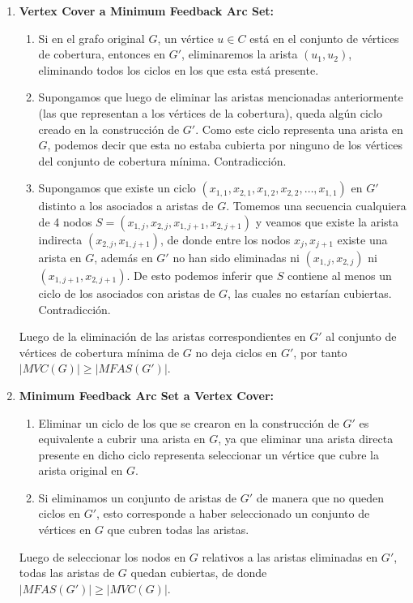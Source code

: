 \documentclass{article}
\begin{document}
\begin{enumerate} 
    \item \textbf{Vertex Cover a Minimum Feedback Arc Set:}
        \begin{enumerate}
            \item Si en el grafo original $ G $, un vértice $ u \in C $ está en el conjunto de vértices de cobertura, entonces en $ G' $, eliminaremos la arista $ (u_1, u_2) $, eliminando todos los ciclos en los que esta está presente.
            \item Supongamos que luego de eliminar las aristas mencionadas anteriormente (las que representan a los vértices de la cobertura), queda algún ciclo creado en la construcción de $ G' $. Como este ciclo representa una arista en $ G $, podemos decir que esta no estaba cubierta por ninguno de los vértices del conjunto de cobertura mínima. Contradicción.
            \item Supongamos que existe un ciclo $(x_{1,1}, x_{2, 1}, x_{1, 2}, x_{2, 2}, \dots, x_{1, 1})$ en $G'$ distinto a los asociados a aristas de $G$. Tomemos una secuencia cualquiera de 4 nodos $S = (x_{1, j}, x_{2, j}, x_{1, j + 1}, x_{2, j + 1})$ y veamos que existe la arista indirecta $(x_{2, j}, x_{1, j + 1})$, de donde entre los nodos $x_j, x_{j + 1}$ existe una arista en $G$, además en $G'$ no han sido eliminadas ni $(x_{1, j}, x_{2, j})$ ni $(x_{1, j + 1}, x_{2, j + 1})$. De esto podemos inferir que $S$ contiene al menos un ciclo de los asociados con aristas de $G$, las cuales no estarían cubiertas. Contradicción.         
        \end{enumerate}
        Luego de la eliminación de las aristas correspondientes en $ G' $ al conjunto de vértices de cobertura mínima de $ G $ no deja ciclos en $ G' $, por tanto $|MVC(G)| \geq |MFAS(G')|$.
    \item \textbf{Minimum Feedback Arc Set a Vertex Cover:}
        \begin{enumerate}
            \item Eliminar un ciclo de los que se crearon en la construcción de $ G' $ es equivalente a cubrir una arista en $ G $, ya que eliminar una arista directa presente en dicho ciclo representa seleccionar un vértice que cubre la arista original en $ G $.
            \item Si eliminamos un conjunto de aristas de $ G' $ de manera que no queden ciclos  en $ G' $, esto corresponde a haber seleccionado un conjunto de vértices en $ G $ que cubren todas las aristas.
        \end{enumerate}
        Luego de seleccionar los nodos en $G$ relativos a las aristas eliminadas en $G'$, todas las aristas de $G$ quedan cubiertas, de donde $|MFAS(G')| \geq |MVC(G)|$.
\end{enumerate}
\end{document}
